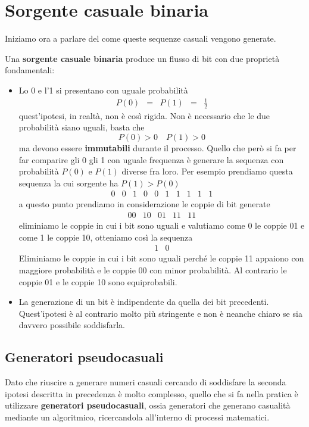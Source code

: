 \section{Sorgente casuale binaria}\label{sorgente_binaria}
Iniziamo ora a parlare del come queste sequenze casuali vengono generate.

\begin{definition}
	Una \textbf{sorgente casuale binaria} produce un flusso di bit con due propriet\`a fondamentali:
	\begin{itemize}
		\item Lo 0 e l'1 si presentano con uguale probabilit\`a
		      \[ \begin{matrix} P(0) & = & P(1) & = & \displaystyle\frac{1}{2} \end{matrix} \]
		      quest'ipotesi, in realt\`a, non \`e cos\`i rigida. Non \`e necessario che le due probabilit\`a siano
		      uguali, basta che
		      \[ P(0) > 0 \quad P(1) > 0 \]
		      ma devono essere \textbf{immutabili} durante il processo. Quello che per\`o si fa per far comparire gli 0
		      gli 1 con uguale frequenza \`e generare la sequenza con probabilit\`a $P(0)$ e $P(1)$ diverse fra loro.
		      Per esempio prendiamo questa sequenza la cui sorgente ha $P(1) > P(0)$
		      \[ \begin{matrix} 0 & 0 & 1 & 0 & 0 & 1 & 1 & 1 & 1 & 1 \end{matrix} \]
		      a questo punto prendiamo in considerazione le coppie di bit generate
		      \[ \begin{matrix} 00 & 10 & 01 & 11 & 11 \end{matrix} \]
		      eliminiamo le coppie in cui i bit sono uguali e valutiamo come 0 le coppie 01 e come 1 le coppie 10,
		      otteniamo cos\`i la sequenza
		      \[ \begin{matrix} 1 & 0 \end{matrix} \]
		      Eliminiamo le coppie in cui i bit sono uguali perch\'e le coppie 11 appaiono con maggiore probabilit\`a
		      e le coppie 00 con minor probabilit\`a. Al contrario le coppie 01 e le coppie 10 sono equiprobabili.
		\item La generazione di un bit \`e indipendente da quella dei bit precedenti. Quest'ipotesi \`e al contrario
		      molto pi\`u stringente e non \`e neanche chiaro se sia davvero possibile soddisfarla.
	\end{itemize}
\end{definition}

\subsection{Generatori pseudocasuali}
Dato che riuscire a generare numeri casuali cercando di soddisfare la seconda ipotesi descritta in precedenza \`e molto
complesso, quello che si fa nella pratica \`e utilizzare \textbf{generatori pseudocasuali}, ossia generatori che generano
casualit\`a mediante un algoritmico, ricercandola all'interno di processi matematici.

